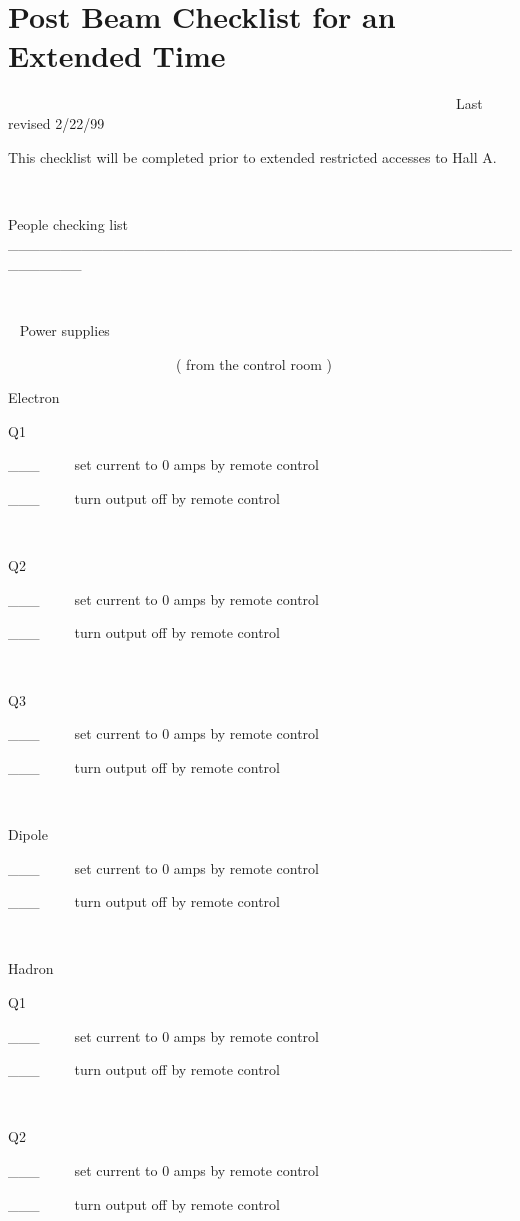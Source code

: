 
\section{Post Beam Checklist for an Extended Time}

~~~~~~~~~~~~~~~~~~~~~~~~~~~~~~~~~~~~~~~~~~~~~~~~~~~~~~~~~~~~~~~~Last revised
2/22/99

This checklist will be completed prior to extended restricted
accesses to Hall A.

~

People checking list \_\_\_\_\_\_\_\_\_\_\_\_\_\_\_\_\_\_\_\_\_\_\_\_\_\_\_\_\_\_\_\_\_\_\_\_\_\_\_\_\_\_\_\_\_\_\_\_\_\_\_\_\_\_\_

~

~ Power supplies

~~~~~~~~~~~~~~~~~~~~~~~~( from the control room )

Electron

Q1

\_\_\_~~~~~set current to 0 amps by remote control 

\_\_\_~~~~~turn output off by remote control 

~

Q2

\_\_\_~~~~~set current to 0 amps by remote control 

\_\_\_~~~~~turn output off by remote control 

~

Q3

\_\_\_~~~~~set current to 0 amps by remote control 

\_\_\_~~~~~turn output off by remote control 

~

Dipole

\_\_\_~~~~~set current to 0 amps by remote control 

\_\_\_~~~~~turn output off by remote control 

~

Hadron

Q1

\_\_\_~~~~~set current to 0 amps by remote control 

\_\_\_~~~~~turn output off by remote control 

~

Q2

\_\_\_~~~~~set current to 0 amps by remote control 

\_\_\_~~~~~turn output off by remote control 

~

